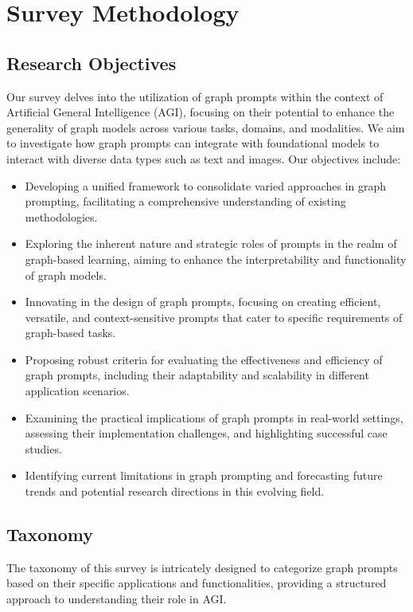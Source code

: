 \section{Survey Methodology}\label{sec:method}

\subsection{Research Objectives}

Our survey delves into the utilization of graph prompts within the context of Artificial General Intelligence (AGI), focusing on their potential to enhance the generality of graph models across various tasks, domains, and modalities. We aim to investigate how graph prompts can integrate with foundational models to interact with diverse data types such as text and images. Our objectives include:

\begin{itemize}
    \item Developing a unified framework to consolidate varied approaches in graph prompting, facilitating a comprehensive understanding of existing methodologies.
    \item Exploring the inherent nature and strategic roles of prompts in the realm of graph-based learning, aiming to enhance the interpretability and functionality of graph models.
    \item Innovating in the design of graph prompts, focusing on creating efficient, versatile, and context-sensitive prompts that cater to specific requirements of graph-based tasks.
    \item Proposing robust criteria for evaluating the effectiveness and efficiency of graph prompts, including their adaptability and scalability in different application scenarios.
    \item Examining the practical implications of graph prompts in real-world settings, assessing their implementation challenges, and highlighting successful case studies.
    \item Identifying current limitations in graph prompting and forecasting future trends and potential research directions in this evolving field.
\end{itemize}

\subsection{Taxonomy}

The taxonomy of this survey is intricately designed to categorize graph prompts based on their specific applications and functionalities, providing a structured approach to understanding their role in AGI.

